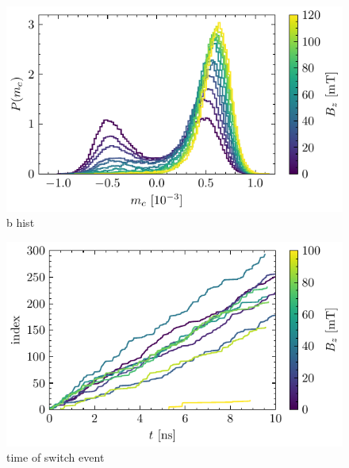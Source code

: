 \documentclass[main.tex]{subfiles}
\begin{document}

\begin{figure}[H]
    \centering
    \includegraphics{bilder/plots/max_Bz/mc_hist.pdf}
    \caption{b hist}\label{fig:b-hist}    
\end{figure}

\begin{figure}[H]
    \centering
    \includegraphics{bilder/plots/max_Bz/switch_events.pdf}
    \caption{time of switch event}\label{fig:bz-switch-events}   
\end{figure}
\end{document}
